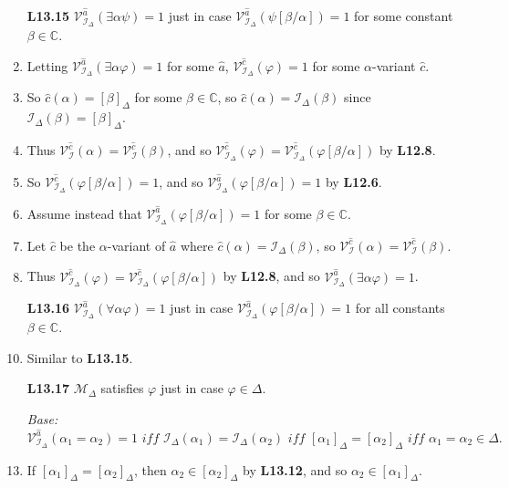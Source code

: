 \documentclass[a4paper, 11pt]{article} %
\newcommand{\I}{\mathcal{I}}
\newcommand{\M}{\mathcal{M}}
\newcommand{\C}{\mathbb{C}}
\newcommand{\VV}[2]{\mathcal{V}_{#1}^{#2}} %
\newcommand{\va}[1]{\hat{#1}} %
\newcommand{\qt}[2]{#1 #2} %
\newcommand{\unisub}[2]{[#1/#2]}
\def\metaA{\ensuremath{\varphi}}
\def\metaB{\ensuremath{\psi}}
\begin{document}
\begin{enumerate}
  \item[\bf L13.15] $\VV{\I_\Delta}{\va{a}}(\qt{\exists}{\alpha}\metaB)=1$ just in case $\VV{\I_\Delta}{\va{a}}(\metaB\unisub{\beta}{\alpha})=1$ for some constant $\beta\in\C$.
  \item Letting $\VV{\I_\Delta}{\va{a}}(\qt{\exists}{\alpha}\metaA)=1$ for some $\va{a}$, $\VV{\I_\Delta}{\va{c}}(\metaA)=1$ for some $\alpha$-variant $\va{c}$.
  \item So $\va{c}(\alpha)=[\beta]_\Delta$ for some $\beta\in\C$, so $\va{c}(\alpha)=\I_\Delta(\beta)$ since $\I_\Delta(\beta)=[\beta]_\Delta$.
  \item Thus $\VV{\I}{\va{c}}(\alpha)=\VV{\I}{\va{c}}(\beta)$, and so $\VV{\I_\Delta}{\va{c}}(\metaA)=\VV{\I_\Delta}{\va{c}}(\metaA\unisub{\beta}{\alpha})$ by \textbf{L12.8}.
  \item So $\VV{\I_\Delta}{\va{c}}(\metaA\unisub{\beta}{\alpha})=1$, and so $\VV{\I_\Delta}{\va{a}}(\metaA\unisub{\beta}{\alpha})=1$ by \textbf{L12.6}.
  \item Assume instead that $\VV{\I_\Delta}{\va{a}}(\metaA\unisub{\beta}{\alpha})=1$ for some $\beta\in\C$.
  \item Let $\va{c}$ be the $\alpha$-variant of $\va{a}$ where $\va{c}(\alpha)=\I_\Delta(\beta)$, so $\VV{\I}{\va{c}}(\alpha)=\VV{\I}{\va{c}}(\beta)$.
  \item Thus $\VV{\I_\Delta}{\va{c}}(\metaA)=\VV{\I_\Delta}{\va{c}}(\metaA\unisub{\beta}{\alpha})$ by \textbf{L12.8}, and so $\VV{\I_\Delta}{\va{a}}(\qt{\exists}{\alpha}\metaA)=1$.
  \item[\bf L13.16] $\VV{\I_\Delta}{\va{a}}(\qt{\forall}{\alpha}\metaA)=1$ just in case $\VV{\I_\Delta}{\va{a}}(\metaA\unisub{\beta}{\alpha})=1$ for all constants $\beta\in\C$.
    \setcounter{enumi}{0}
  \item Similar to \textbf{L13.15}.
  \item[\bf L13.17] $\M_\Delta$ satisfies $\metaA$ just in case $\metaA\in\Delta$.
    \setcounter{enumi}{0}
  \item[\it Base:] 
    $\VV{\I_\Delta}{\va{a}}(\alpha_1=\alpha_2)=1
      \textit{ iff } \I_\Delta(\alpha_1)=\I_\Delta(\alpha_2)
      \textit{ iff } [\alpha_1]_\Delta=[\alpha_2]_\Delta
      \textit{ iff } \alpha_1=\alpha_2\in\Delta.$
  \item If $[\alpha_1]_\Delta=[\alpha_2]_\Delta$, then $\alpha_2\in[\alpha_2]_\Delta$ by \textbf{L13.12}, and so $\alpha_2\in[\alpha_1]_\Delta$.

\end{enumerate}
\end{document}
